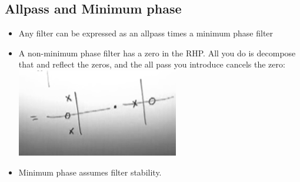 \subsection*{Allpass and Minimum phase}
\begin{itemize}
\item{Any filter can be expressed as an allpass times a minimum phase
filter}
\item{A non-minimum phase filter has a zero in the RHP. All you do
is decompose that and reflect the zeros, and the all pass you introduce
cancels the zero:
    \includegraphics[scale=0.4]{frames/23h}
}
\item{
Minimum phase assumes filter stability.
}
\end{itemize}

